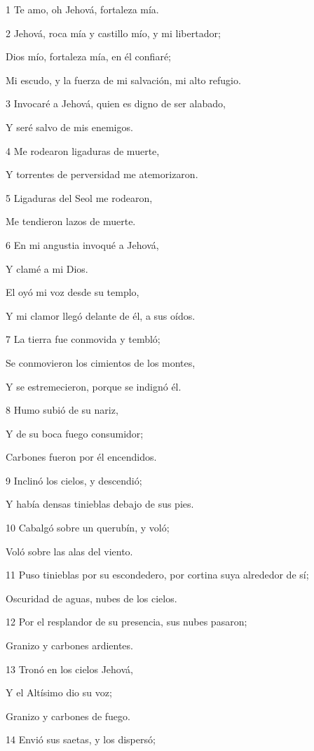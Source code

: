 \par 1 Te amo, oh Jehová, fortaleza mía.
\par 2 Jehová, roca mía y castillo mío, y mi libertador;
\par Dios mío, fortaleza mía, en él confiaré;
\par Mi escudo, y la fuerza de mi salvación, mi alto refugio.
\par 3 Invocaré a Jehová, quien es digno de ser alabado,
\par Y seré salvo de mis enemigos.
\par 4 Me rodearon ligaduras de muerte,
\par Y torrentes de perversidad me atemorizaron.
\par 5 Ligaduras del Seol me rodearon,
\par Me tendieron lazos de muerte.
\par 6 En mi angustia invoqué a Jehová,
\par Y clamé a mi Dios.
\par El oyó mi voz desde su templo,
\par Y mi clamor llegó delante de él, a sus oídos.
\par 7 La tierra fue conmovida y tembló;
\par Se conmovieron los cimientos de los montes,
\par Y se estremecieron, porque se indignó él.
\par 8 Humo subió de su nariz,
\par Y de su boca fuego consumidor;
\par Carbones fueron por él encendidos.
\par 9 Inclinó los cielos, y descendió;
\par Y había densas tinieblas debajo de sus pies.
\par 10 Cabalgó sobre un querubín, y voló;
\par Voló sobre las alas del viento.
\par 11 Puso tinieblas por su escondedero, por cortina suya alrededor de sí;
\par Oscuridad de aguas, nubes de los cielos.
\par 12 Por el resplandor de su presencia, sus nubes pasaron;
\par Granizo y carbones ardientes.
\par 13 Tronó en los cielos Jehová,
\par Y el Altísimo dio su voz;
\par Granizo y carbones de fuego.
\par 14 Envió sus saetas, y los dispersó;

